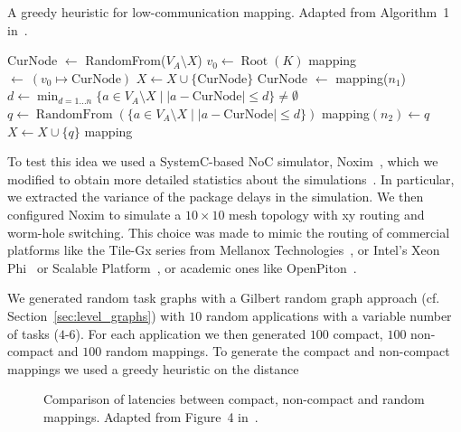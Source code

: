 \begin{algorithm}
	\caption{A greedy heuristic for low-communication mapping. Adapted from Algorithm~1 in~\cite{goens_samos19}.}
	\label{algo:greedy_mapping}
	\begin{algorithmic}[1]
	  \State CurNode $\leftarrow$ RandomFrom($V_A \setminus X$)
	  \State $v_0 \leftarrow \operatorname{Root}(K)$
	  \State mapping $\leftarrow~(v_0 \mapsto \text{CurNode})$
	  \State $X \leftarrow X \cup \{ \text{CurNode} \}$
		  \State CurNode $\leftarrow$ mapping($n_1$)
		  \State $d \leftarrow \min_{d = 1 \ldots n} \{a \in V_A \setminus X \mid |a - \text{CurNode}| \leq d \} \neq \emptyset $
		  \State $q \leftarrow \operatorname{RandomFrom}(\{ a \in V_A \setminus X \mid |a - \text{CurNode}| \leq d  \})$
		  \State mapping$(n_2) \leftarrow q $
		  \State $X \leftarrow X \cup \{q\}$
	  \EndFor 
	  \Return mapping
	\end{algorithmic}
  \end{algorithm}


To test this idea we used a SystemC-based \ac{NoC} simulator, Noxim~\cite{noxim}, which we modified to obtain more detailed statistics about the simulations~\cite{goens_samos19}.
In particular, we extracted the variance of the package delays in the simulation. 
We then configured Noxim to simulate a $10 \times 10$ mesh topology with xy routing and worm-hole switching. 
This choice was made to mimic the routing of commercial platforms like the Tile-Gx series from Mellanox Technologies~\cite{technologies2015-tile-gx36-processor,technologies2015-tile-gx72-processor}, or Intel's Xeon Phi~\cite{tam2018-skylake-sp} or Scalable Platform~\cite{sodani2016knights-landing}, or academic ones like OpenPiton~\cite{balkind2016-openpiton}.

We generated random task graphs with a Gilbert random graph approach (cf. Section~\ref{sec:level_graphs}) with $10$ random applications with a variable number of tasks ($4$-$6$).
For each application we then generated $100$ compact, $100$ non-compact and $100$ random mappings. 
To generate the compact and non-compact mappings we used a greedy heuristic on the distance 
\begin{figure}[h]
	\centering
	\caption{Comparison of latencies between compact, non-compact and random mappings. Adapted from Figure~4 in~\cite{goens_samos19}.}
	\label{fig:compact_latency}
\end{figure}

